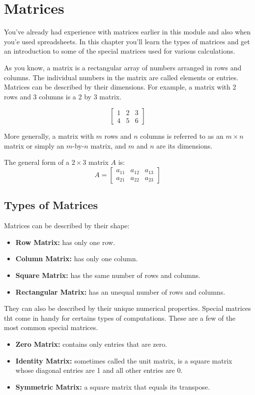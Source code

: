 \chapter{Matrices}
You've already had experience with matrices earlier in this module and also when you'e used spreadsheets. In this chapter you'll learn the types of matrices and get an introduction to some of the special matrices used for various calculations. 

As you know, a matrix is a rectangular array of numbers arranged in rows and columns. The individual numbers in the matrix are called elements or entries. Matrices can be described by their dimensions. For example, a matrix with 2 rows and 3 columns is a 2 by 3 matrix.

$$\begin{bmatrix}
1 &2  &3\\
 4 &5  &6 
\end{bmatrix}
$$

More generally, a matrix with $m$ rows and $n$ columns is referred to as an $m \times n$ matrix or simply an $m$-by-$n$ matrix, and $m$ and $n$ are its dimensions.

The general form of a $2 \times 3$ matrix $A$ is:
$$
A = \begin{bmatrix}
a_{11} & a_{12} & a_{13} \\
a_{21} & a_{22} & a_{23}
\end{bmatrix}
$$

\section{Types of Matrices}
Matrices can be described by their shape:
\begin{itemize}
	\item \textbf{Row Matrix:} has only one row.
	\item \textbf{Column Matrix:} has only one column.
	\item \textbf{Square Matrix:} has the same number of rows and columns.
	\item \textbf{Rectangular Matrix:} has an unequal number of rows and columns.
\end{itemize}

They can also be described by their unique numerical properties. Special matrices tht come in handy for certains types of computations. These are a few of the most common special matrices.
\begin{itemize}
	\item \textbf{Zero Matrix:} contains only entries that are zero.
	\item \textbf{Identity Matrix:} sometimes called the unit matrix, is a square matrix whose diagonal entries are 1 and all other entries are 0.
	\item \textbf{Symmetric Matrix:} a square matrix that equals its transpose.
\end{itemize}

